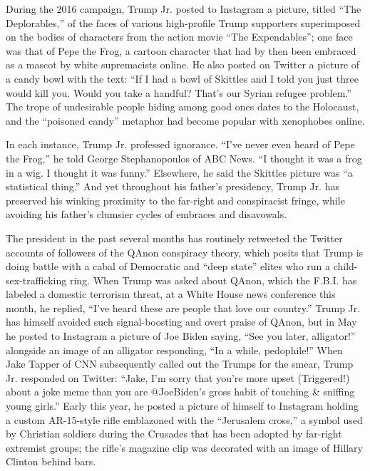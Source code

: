 During the 2016 campaign, Trump Jr. posted to Instagram a picture,
titled ``The Deplorables,'' of the faces of various high-profile Trump
supporters superimposed on the bodies of characters from the action
movie ``The Expendables''; one face was that of Pepe the Frog, a cartoon
character that had by then been embraced as a mascot by white
supremacists online. He also posted on Twitter a picture of a candy bowl
with the text: ``If I had a bowl of Skittles and I told you just three
would kill you. Would you take a handful? That's our Syrian refugee
problem.'' The trope of undesirable people hiding among good ones dates
to the Holocaust, and the ``poisoned candy'' metaphor had become popular
with xenophobes online.

In each instance, Trump Jr. professed ignorance. ``I've never even heard
of Pepe the Frog,'' he told George Stephanopoulos of ABC News. ``I
thought it was a frog in a wig. I thought it was funny.'' Elsewhere, he
said the Skittles picture was ``a statistical thing.'' And yet
throughout his father's presidency, Trump Jr. has preserved his winking
proximity to the far-right and conspiracist fringe, while avoiding his
father's clumsier cycles of embraces and disavowals.

The president in the past several months has routinely retweeted the
Twitter accounts of followers of the QAnon conspiracy theory, which
posits that Trump is doing battle with a cabal of Democratic and ``deep
state'' elites who run a child-sex-trafficking ring. When Trump was
asked about QAnon, which the F.B.I. has labeled a domestic terrorism
threat, at a White House news conference this month, he replied, ``I've
heard these are people that love our country.'' Trump Jr. has himself
avoided such signal-boosting and overt praise of QAnon, but in May he
posted to Instagram a picture of Joe Biden saying, ``See you later,
alligator!'' alongside an image of an alligator responding, ``In a
while, pedophile!'' When Jake Tapper of CNN subsequently called out the
Trumps for the smear, Trump Jr. responded on Twitter: ``Jake, I'm sorry
that you're more upset (Triggered!) about a joke meme than you are
@JoeBiden's gross habit of touching \& sniffing young girls.'' Early
this year, he posted a picture of himself to Instagram holding a custom
AR-15-style rifle emblazoned with the ``Jerusalem cross,'' a symbol used
by Christian soldiers during the Crusades that has been adopted by
far-right extremist groups; the rifle's magazine clip was decorated with
an image of Hillary Clinton behind bars.

